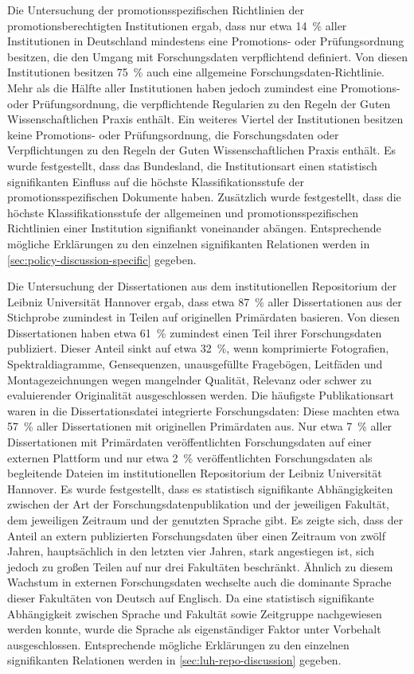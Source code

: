Die Untersuchung der promotionsspezifischen Richtlinien der promotionsberechtigten Institutionen ergab, dass nur etwa \SI{14}{\percent} aller Institutionen in Deutschland mindestens eine Promotions- oder Prüfungsordnung besitzen, die den Umgang mit Forschungsdaten verpflichtend definiert.
Von diesen Institutionen besitzen \SI{75}{\percent} auch eine allgemeine Forschungsdaten-Richtlinie.
Mehr als die Hälfte aller Institutionen haben jedoch zumindest eine Promotions- oder Prüfungsordnung, die verpflichtende Regularien zu den Regeln der Guten Wissenschaftlichen Praxis enthält. 
Ein weiteres Viertel der Institutionen besitzen keine Promotions- oder Prüfungsordnung, die Forschungsdaten oder Verpflichtungen zu den Regeln der Guten Wissenschaftlichen Praxis enthält.
Es wurde festgestellt, dass das Bundesland, die Institutionsart einen statistisch signifikanten Einfluss auf die höchste Klassifikationsstufe der promotionsspezifischen Dokumente haben.
Zusätzlich wurde festgestellt, dass die höchste Klassifikationsstufe der allgemeinen und promotionsspezifischen Richtlinien einer Institution signifiankt voneinander abängen.
Entsprechende mögliche Erklärungen zu den einzelnen signifikanten Relationen werden in \cref{sec:policy-discussion-specific} gegeben.

Die Untersuchung der Dissertationen aus dem institutionellen Repositorium der Leibniz Universität Hannover ergab, dass etwa \SI{87}{\percent} aller Dissertationen aus der Stichprobe zumindest in Teilen auf originellen Primärdaten basieren.
Von diesen Dissertationen haben etwa \SI{61}{\percent} zumindest einen Teil ihrer Forschungsdaten publiziert.
Dieser Anteil sinkt auf etwa \SI{32}{\percent}, wenn komprimierte Fotografien, Spektraldiagramme, Gensequenzen, unausgefüllte Fragebögen, Leitfäden und Montagezeichnungen wegen mangelnder Qualität, Relevanz oder schwer zu evaluierender Originalität ausgeschlossen werden.
Die häufigste Publikationsart waren in die Dissertationsdatei integrierte Forschungsdaten: Diese machten etwa \SI{57}{\percent} aller Dissertationen mit originellen Primärdaten aus.
Nur etwa \SI{7}{\percent} aller Dissertationen mit Primärdaten veröffentlichten Forschungsdaten auf einer externen Plattform und nur etwa \SI{2}{\percent} veröffentlichten Forschungsdaten als begleitende Dateien im institutionellen Repositorium der Leibniz Universität Hannover.
Es wurde festgestellt, dass es statistisch signifikante Abhängigkeiten zwischen der Art der Forschungsdatenpublikation und der jeweiligen Fakultät, dem jeweiligen Zeitraum und der genutzten Sprache gibt.
Es zeigte sich, dass der Anteil an extern publizierten Forschungsdaten über einen Zeitraum von zwölf Jahren, hauptsächlich in den letzten vier Jahren, stark angestiegen ist, sich jedoch zu großen Teilen auf nur drei Fakultäten beschränkt.
Ähnlich zu diesem Wachstum in externen Forschungsdaten wechselte auch die dominante Sprache dieser Fakultäten von Deutsch auf Englisch.
Da eine statistisch signifikante Abhängigkeit zwischen Sprache und Fakultät sowie Zeitgruppe nachgewiesen werden konnte, wurde die Sprache als eigenständiger Faktor unter Vorbehalt ausgeschlossen.
Entsprechende mögliche Erklärungen zu den einzelnen signifikanten Relationen werden in \cref{sec:luh-repo-discussion} gegeben.

